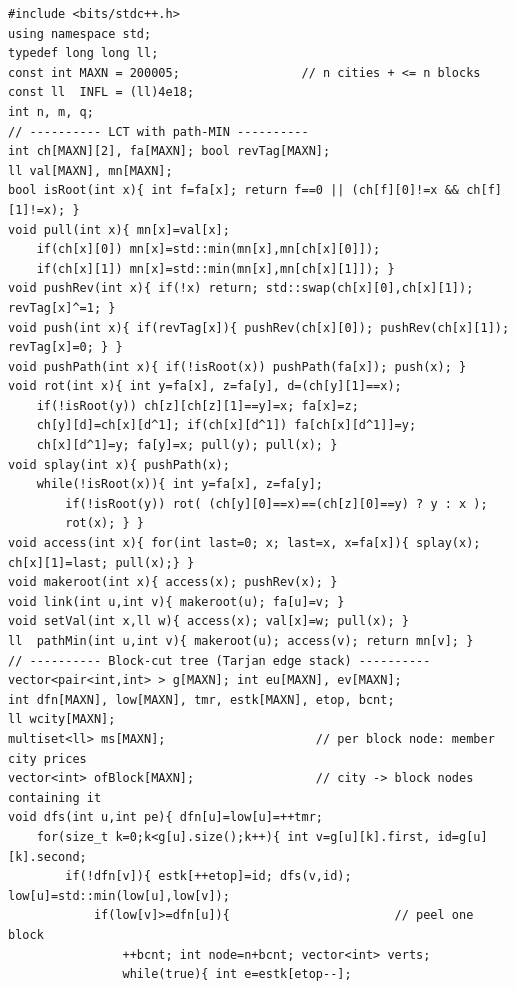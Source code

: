 \begin{lstlisting}[caption={CF 487E Summit: Tarjan block-cut tree (edge stack) built once, then the chapter's evert-then-access LCT path-min over it. A block node stores the multiset-min of its member city prices, a city node its own price; A a b = makeroot(a);access(b);mn[b], C a w re-pushes the few blocks containing a plus city a itself. ASCII only, identifiers without underscores.}, label={lst:c23-summit}]
#include <bits/stdc++.h>
using namespace std;
typedef long long ll;
const int MAXN = 200005;                 // n cities + <= n blocks
const ll  INFL = (ll)4e18;
int n, m, q;
// ---------- LCT with path-MIN ----------
int ch[MAXN][2], fa[MAXN]; bool revTag[MAXN];
ll val[MAXN], mn[MAXN];
bool isRoot(int x){ int f=fa[x]; return f==0 || (ch[f][0]!=x && ch[f][1]!=x); }
void pull(int x){ mn[x]=val[x];
    if(ch[x][0]) mn[x]=std::min(mn[x],mn[ch[x][0]]);
    if(ch[x][1]) mn[x]=std::min(mn[x],mn[ch[x][1]]); }
void pushRev(int x){ if(!x) return; std::swap(ch[x][0],ch[x][1]); revTag[x]^=1; }
void push(int x){ if(revTag[x]){ pushRev(ch[x][0]); pushRev(ch[x][1]); revTag[x]=0; } }
void pushPath(int x){ if(!isRoot(x)) pushPath(fa[x]); push(x); }
void rot(int x){ int y=fa[x], z=fa[y], d=(ch[y][1]==x);
    if(!isRoot(y)) ch[z][ch[z][1]==y]=x; fa[x]=z;
    ch[y][d]=ch[x][d^1]; if(ch[x][d^1]) fa[ch[x][d^1]]=y;
    ch[x][d^1]=y; fa[y]=x; pull(y); pull(x); }
void splay(int x){ pushPath(x);
    while(!isRoot(x)){ int y=fa[x], z=fa[y];
        if(!isRoot(y)) rot( (ch[y][0]==x)==(ch[z][0]==y) ? y : x );
        rot(x); } }
void access(int x){ for(int last=0; x; last=x, x=fa[x]){ splay(x); ch[x][1]=last; pull(x);} }
void makeroot(int x){ access(x); pushRev(x); }
void link(int u,int v){ makeroot(u); fa[u]=v; }
void setVal(int x,ll w){ access(x); val[x]=w; pull(x); }
ll  pathMin(int u,int v){ makeroot(u); access(v); return mn[v]; }
// ---------- Block-cut tree (Tarjan edge stack) ----------
vector<pair<int,int> > g[MAXN]; int eu[MAXN], ev[MAXN];
int dfn[MAXN], low[MAXN], tmr, estk[MAXN], etop, bcnt;
ll wcity[MAXN];
multiset<ll> ms[MAXN];                     // per block node: member city prices
vector<int> ofBlock[MAXN];                 // city -> block nodes containing it
void dfs(int u,int pe){ dfn[u]=low[u]=++tmr;
    for(size_t k=0;k<g[u].size();k++){ int v=g[u][k].first, id=g[u][k].second;
        if(!dfn[v]){ estk[++etop]=id; dfs(v,id); low[u]=std::min(low[u],low[v]);
            if(low[v]>=dfn[u]){                       // peel one block
                ++bcnt; int node=n+bcnt; vector<int> verts;
                while(true){ int e=estk[etop--];

\end{lstlisting}
